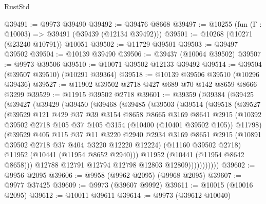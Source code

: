 \begin{lexlean}{RustStd}
\begin{coremodule}
@39491 := @9973 @39490
@39492 := @39476 @8668
@39497 := @10255 (fun (Γ : @10003) => @39491 (@39439 (@12134 @39492)))
@39501 := @10268 (@10271 (@23240 @10791)) @10051
@39502 := @11729 @39501
@39503 := @39497 @39502
@39504 := @10139 @39490
@39506 := @39437 (@10064 @39502)
@39507 := @9973 @39506
@39510 := @10071 @39502 @12133 @39492
@39514 := @39504 (@39507 @39510) (@10291 @39364)
@39518 := @10139 @39506 @39510 (@10296 @39436)
@39527 := @11902 @39502 @2718 @427 @689 @70 @142 @8659 @8666 @3299
@39529 := @11915 @39502 @2718
@39601 := @39359
    (@39384
      (@39425
        (@39427
          (@39429
            (@39450
              (@39468
                (@39485
                  (@39503
                    (@39514
                      (@39518
                        (@39527
                          (@39529
                            @121
                            @429
                            @37
                            @39
                            @3154
                            @8658
                            @8665
                            @3169
                            @8641
                            @2915
                            (@10392
                              @39502
                              @2718
                              @105
                              @37
                              @105
                              @3154
                              (@10400 (@10401 @39502 @105))
                              @11798)
                            (@39529
                              @405
                              @115
                              @37
                              @11
                              @3220
                              @2940
                              @2934
                              @3169
                              @8651
                              @2915
                              (@10891 @39502 @2718 @37 @404 @3220 @12220 @12224)
                              (@11160 @39502 @2718)
                              @11952
                              (@10441 (@11954 @8652 @2940)))
                            @11952
                            (@10441 (@11954 @8642 @8658)))
                          @12788
                          @12791
                          @12794
                          @12798
                          @12803
                          @12809)))))))))))
@39602 := @9956 @2095
@39606 := @9958 (@9962 @2095) (@9968 @2095)
@39607 := @9977 @37425
@39609 := @9973 (@39607 @9992)
@39611 := @10015 (@10016 @2095)
@39612 := @10011 @39611
@39614 := @9973 (@39612 @10040)

\end{coremodule}
\end{lexlean}
